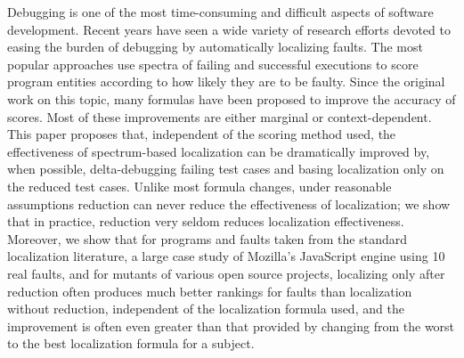 Debugging is one of the most time-consuming and difficult aspects of
software development.  Recent years have seen a wide variety of
research efforts devoted to easing the burden of debugging by
automatically localizing faults.  The most popular approaches use
spectra of failing and successful executions to score program entities
according to how likely they are to be faulty.  Since the original
work on this topic, many formulas have been proposed to improve the
accuracy of scores.  Most of these improvements are either marginal or
context-dependent.  This paper proposes that, independent of the
scoring method used, the effectiveness of spectrum-based localization
can be dramatically improved by, when possible, delta-debugging
failing test cases and basing localization only on the reduced test
cases.  Unlike most formula changes, under reasonable assumptions
reduction can never reduce the effectiveness of localization; we show
that in practice, reduction very seldom reduces localization
effectiveness.  Moreover, we show that for programs and faults taken
from the standard localization literature, a large case study of
Mozilla's JavaScript engine using 10 real faults, and for mutants of
various open source projects, localizing only after reduction often
produces much better rankings for faults than localization without
reduction, independent of the localization formula used, and the
improvement is often even greater than that provided by changing from
the worst to the best localization formula for a subject.
